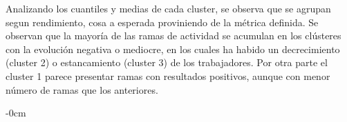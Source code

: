 \documentclass[notspecified,article,submit,moreauthors,pdftex]{Definitions/mdpi}
\begin{document}
Analizando los cuantiles y medias de cada cluster, se observa que se
agrupan segun rendimiento, cosa a esperada proviniendo de la métrica
definida. Se observan que la mayoría de las ramas de actividad se
acumulan en los clústeres con la evolución negativa o mediocre, en los
cuales ha habido un decrecimiento (cluster 2) o estancamiento (cluster
3) de los trabajadores. Por otra parte el cluster 1 parece presentar
ramas con resultados positivos, aunque con menor número de ramas que los
anteriores.


\vspace{6pt}













\begin{adjustwidth}{-\extralength}{0cm}





%

\PublishersNote{}
\end{adjustwidth}
\end{document}
